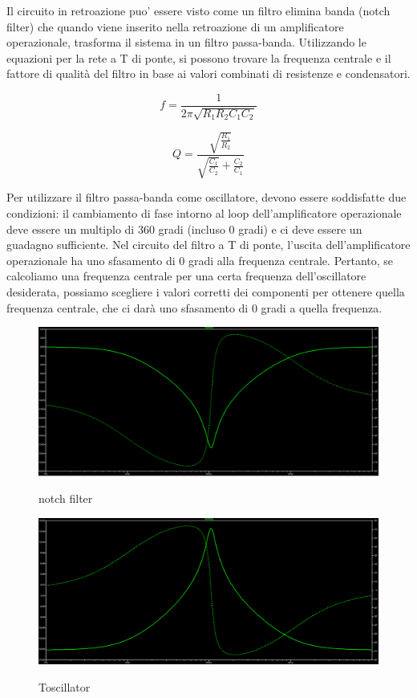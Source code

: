 \documentclass{article}
\begin{document}
Il circuito in retroazione puo' essere visto come un filtro elimina banda  (notch filter) 
che quando viene inserito nella retroazione di un amplificatore operazionale, trasforma il sistema in un filtro passa-banda. Utilizzando le equazioni per la rete a T di ponte, si possono trovare la frequenza centrale e il fattore di qualità del filtro in base ai valori combinati di resistenze e condensatori.

\begin{equation}
    f = \frac{1}{2 \pi\sqrt{R_1 R_2 C_1 C_2}}
\end{equation}

\begin{equation}
    Q = \frac{\sqrt{\frac{R_1}{R_2}}}{\sqrt{\frac{C_1}{C_2}} + {\frac{C_2}{C_1}}}
\end{equation}


Per utilizzare il filtro passa-banda come oscillatore, devono essere soddisfatte due condizioni: il cambiamento di fase intorno al loop dell'amplificatore operazionale deve essere un multiplo di 360 gradi (incluso 0 gradi) e ci deve essere un guadagno sufficiente.
Nel circuito del filtro a T di ponte, l'uscita dell'amplificatore operazionale ha uno sfasamento di 0 gradi alla frequenza centrale. Pertanto, se calcoliamo una frequenza centrale per una certa frequenza dell'oscillatore desiderata, possiamo scegliere i valori corretti dei componenti per ottenere quella frequenza centrale, che ci darà uno sfasamento di 0 gradi a quella frequenza. 

\newpage

\begin{figure}[h]
    \centering
    \caption{notch filter}
    \includegraphics[width=\textwidth]{notch2.png} 
    \label{fig:notch filter}
\end{figure}

\begin{figure}[h]
    \centering
    \caption{Toscillator}
    \includegraphics[width=\textwidth]{toscillatorefrequency.png} 
    \label{fig:notch filter}
\end{figure}
\newpage
\end{document}
